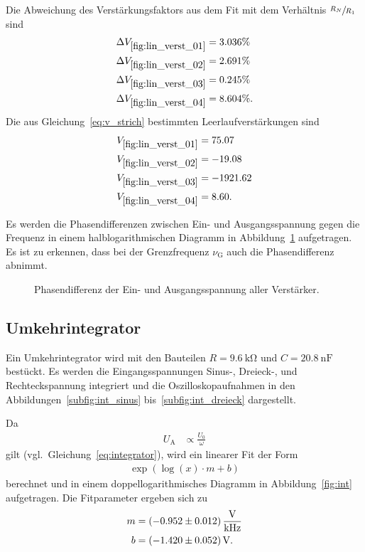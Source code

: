 Die Abweichung des Verstärkungsfaktors aus dem Fit mit dem Verhältnis $\sfrac{R_N}{R_1}$
sind
\begin{align*}
  \Delta V_{\ref{fig:lin_verst_01}} &= \num{3.036}\% \\
  \Delta V_{\ref{fig:lin_verst_02}} &= \num{2.691}\% \\
  \Delta V_{\ref{fig:lin_verst_03}} &= \num{0.245}\% \\
  \Delta V_{\ref{fig:lin_verst_04}} &= \num{8.604}\%.
\end{align*}
Die aus Gleichung~\eqref{eq:v_strich} bestimmten Leerlaufverstärkungen sind
\begin{align*}
  V_{\ref{fig:lin_verst_01}} &= \num{75.07} \\
  V_{\ref{fig:lin_verst_02}} &= \num{-19.08} \\
  V_{\ref{fig:lin_verst_03}} &= \num{-1921.62} \\
  V_{\ref{fig:lin_verst_04}} &= \num{  8.60}.
\end{align*}

Es werden die Phasendifferenzen zwischen Ein- und Ausgangsspannung gegen die Frequenz
in einem halblogarithmischen Diagramm in Abbildung~\ref{fig:phasendiff} aufgetragen.
Es ist zu erkennen, dass bei der Grenzfrequenz $\nu_\text{G}$ auch die Phasendifferenz abnimmt.

\begin{figure}[ht]
  \centering
  
  \caption{Phasendifferenz der Ein- und Ausgangsspannung aller Verstärker.}
  \label{fig:phasendiff}
\end{figure}

\FloatBarrier
\subsection{Umkehrintegrator}
Ein Umkehrintegrator wird mit den Bauteilen $R = \SI{9.6}{\kilo\ohm}$ und $C = \SI{20.8}{\nano\farad}$ bestückt.
Es werden die Eingangsspannungen Sinus-, Dreieck-, und Rechteckspannung integriert und die Oszilloskopaufnahmen in den Abbildungen~\ref{subfig:int_sinus} bis~\ref{subfig:int_dreieck} dargestellt.

Da
\begin{align*}
  U_\text{A} &\propto \frac{U_0}{\omega}
\end{align*}
gilt (vgl.\ Gleichung~\eqref{eq:integrator}),
wird ein linearer Fit der Form
\begin{align*}
  \exp{\left(\log{\left(x\right)} \cdot m + b\right)}
\end{align*}
berechnet und in einem doppellogarithmisches Diagramm in Abbildung~\ref{fig:int} aufgetragen.
Die Fitparameter ergeben sich zu
\begin{align*}
  m &= \SI{-0.952 \pm 0.012}{\volt\per\kilo\hertz} \\
  b &= \SI{-1.42 \pm 0.052}{\volt}.
\end{align*}

